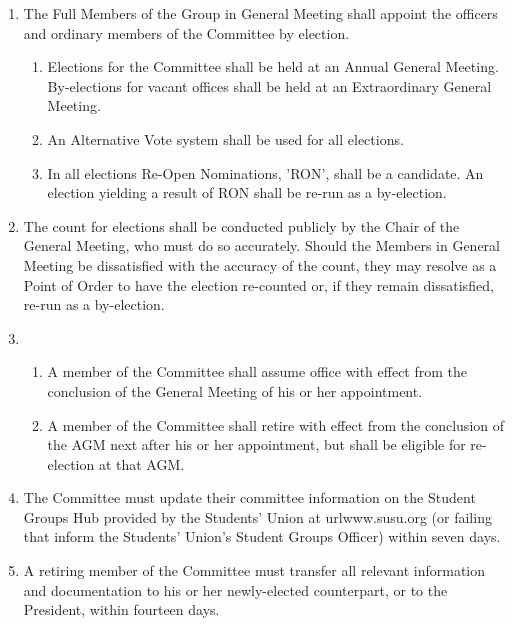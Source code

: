 \documentclass[12pt]{constitution}
\begin{document}
\begin{enumerate}
    \item The Full Members of the Group in General Meeting shall appoint the officers and ordinary members of the Committee by election.
    \begin{enumerate}
        \item Elections for the Committee shall be held at an Annual General Meeting.  By-elections for vacant offices shall be held at an Extraordinary General Meeting.
        \item An Alternative Vote system shall be used for all elections.
        \item In all elections Re-Open Nominations, 'RON', shall be a candidate.  An election yielding a result of RON shall be re-run as a by-election.
    \end{enumerate}

    \item The count for elections shall be conducted publicly by the Chair of the General Meeting, who must do so accurately.  Should the Members in General Meeting be dissatisfied with the accuracy of the count, they may resolve as a Point of Order to have the election re-counted or, if they remain dissatisfied, re-run as a by-election.
    
    \item \begin{enumerate}
        \item A member of the Committee shall assume office with effect from the conclusion of the General Meeting of his or her appointment.
        \item A member of the Committee shall retire with effect from the conclusion of the AGM next after his or her appointment, but shall be eligible for re-election at that AGM.
    \end{enumerate}

    \item The Committee must update their committee information on the Student Groups Hub provided by the Students' Union at url{www.susu.org} (or failing that inform the Students' Union's Student Groups Officer) within seven days.  
    \item A retiring member of the Committee must transfer all relevant information and documentation to his or her newly-elected counterpart, or to the President, within fourteen days.
\end{enumerate}

\end{document}
